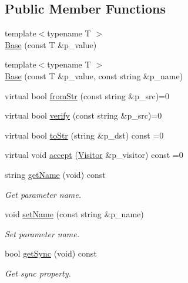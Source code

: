 \subsection*{Public Member Functions}
\begin{DoxyCompactItemize}
\item 
{\footnotesize template$<$typename T $>$ }\\\hyperlink{classxtd_1_1servers_1_1param_1_1Base_ae7148147e419f2a3e5b27929e8b99b54}{Base} (const T \&p\+\_\+value)
\item 
{\footnotesize template$<$typename T $>$ }\\\hyperlink{classxtd_1_1servers_1_1param_1_1Base_aeadfa5af86a0dd70c6068a994f7ff567}{Base} (const T \&p\+\_\+value, const string \&p\+\_\+name)
\item 
virtual bool \hyperlink{classxtd_1_1servers_1_1param_1_1Base_a74a64bb56c20b892c9be9b786a2d94d1}{from\+Str} (const string \&p\+\_\+src)=0
\item 
virtual bool \hyperlink{classxtd_1_1servers_1_1param_1_1Base_a74d9a61d65e6e66492b2205489d9b2cf}{verify} (const string \&p\+\_\+src)=0
\item 
virtual bool \hyperlink{classxtd_1_1servers_1_1param_1_1Base_ab80c9c70cacf5a8cebb98486fba83116}{to\+Str} (string \&p\+\_\+dst) const =0
\item 
virtual void \hyperlink{classxtd_1_1servers_1_1param_1_1Base_a37a0c2247274dce2395517186ec70d7a}{accept} (\hyperlink{classxtd_1_1servers_1_1param_1_1Visitor}{Visitor} \&p\+\_\+visitor) const =0
\item 
string \hyperlink{classxtd_1_1servers_1_1param_1_1Base_a1e688aa518e874229d45a348c7596c82}{get\+Name} (void) const 
\begin{DoxyCompactList}\small\item\em Get parameter name. \end{DoxyCompactList}\item 
void \hyperlink{classxtd_1_1servers_1_1param_1_1Base_af0a668bb0360d7c2a8821527888d16d2}{set\+Name} (const string \&p\+\_\+name)
\begin{DoxyCompactList}\small\item\em Set parameter name. \end{DoxyCompactList}\item 
bool \hyperlink{classxtd_1_1servers_1_1param_1_1Base_a3d83345a6e83bbe96cb7e13c81061c7d}{get\+Sync} (void) const 
\begin{DoxyCompactList}\small\item\em Get sync property. \end{DoxyCompactList}\item 

\end{DoxyCompactItemize}
